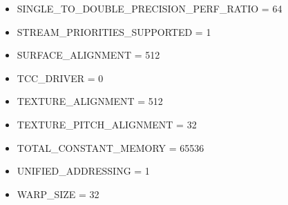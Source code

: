 \documentclass{article}
\begin{document}
\begin{itemize}
    \item SINGLE\_TO\_DOUBLE\_PRECISION\_PERF\_RATIO = 64
    \item STREAM\_PRIORITIES\_SUPPORTED = 1
    \item SURFACE\_ALIGNMENT = 512
    \item TCC\_DRIVER = 0
    \item TEXTURE\_ALIGNMENT = 512
    \item TEXTURE\_PITCH\_ALIGNMENT = 32
    \item TOTAL\_CONSTANT\_MEMORY = 65536
    \item UNIFIED\_ADDRESSING = 1
    \item WARP\_SIZE = 32
\end{itemize}
\end{document}
